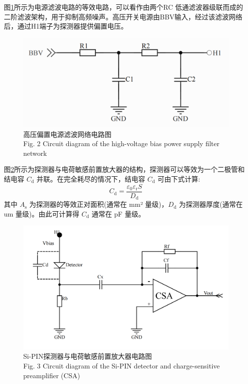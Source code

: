 \documentclass{ctexart}
\begin{document}
图\ref{fig:power_filter}所示为电源滤波电路的等效电路，可以看作由两个RC 低通滤波器级联而成的二阶滤波架构，用于抑制高频噪声\cite{8}。高压开关电源由BBV输入，经过该滤波网络后，通过H1端子为探测器提供偏置电压。

\begin{figure}[!h]
    \centering
    \includegraphics[width=\linewidth]{./power_filter.png}
    \caption{高压偏置电源滤波网络电路图 \\ Fig. 2 Circuit diagram of the high-voltage bias power supply filter network}
    \label{fig:power_filter}
\end{figure}

图\ref{fig:detector_csa}所示为探测器与电荷敏感前置放大器的结构，探测器可以等效为一个二极管和结电容 $C_{\mathrm{d}}$ 并联。在完全耗尽的情况下，结电容 $C_{\mathrm{d}}$ 可由下式计算\cite{9}:
\begin{equation*}
C_{\mathrm{d}} = \frac{\varepsilon_0 \varepsilon_{\mathrm{r}} S}{D_{\mathrm{d}}}
\end{equation*}
其中 $A_{\mathrm{s}}$ 为探测器的等效正对面积(通常在 mm² 量级)，$D_{\mathrm{d}}$ 为探测器厚度(通常在 um 量级)。由此可计算得 $C_{\mathrm{d}}$ 通常在 pF 量级。

\begin{figure}[!h]
    \centering
    \includegraphics[width=\linewidth]{./detector.png}
    \caption{Si-PIN探测器与电荷敏感前置放大器电路图 \\ Fig. 3 Circuit diagram of the Si-PIN detector and charge-sensitive preamplifier (CSA)}
    \label{fig:detector_csa}
\end{figure}
\end{document}
